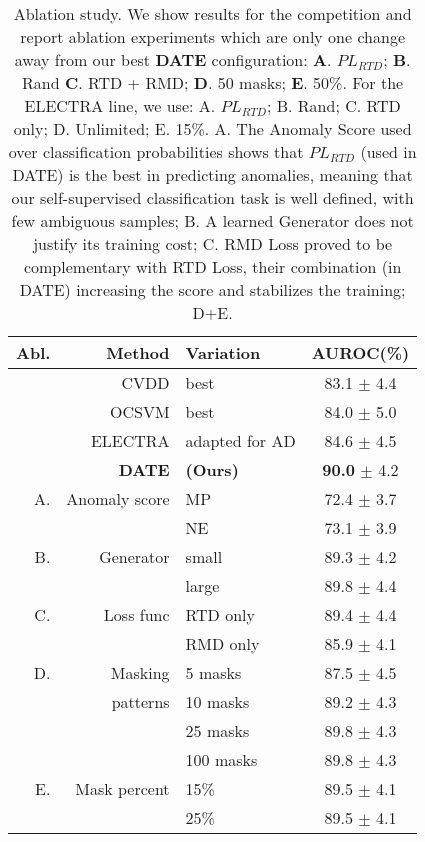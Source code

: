 \documentclass[11pt]{article}
\begin{document}
\setlength{\tabcolsep}{3pt}
\begin{table}[t!]
\begin{center}
	\begin{tabular}{r r l c}
		\toprule
		\multicolumn{1}{p{0.1cm}}{Abl.} &
        \multicolumn{1}{p{1.5cm}}{\raggedright \;\;\;\;\;\;\;\;\;\;\;Method} &
        \multicolumn{1}{p{0.5cm}}{\raggedleft Variation} &
        \multicolumn{1}{p{0.9cm}}{\centering AUROC(\%)} \\
        \midrule
        & CVDD  & best & 83.1 $\pm$ \small 4.4 \\
        
        & OCSVM & best & 84.0 $\pm$ \small 5.0 \\ 
        
        & ELECTRA & adapted for AD & 84.6  $\pm$ \small 4.5\\ 

        & \textbf{DATE} & \textbf{(Ours)} & \textbf{90.0} $\pm$ \small 4.2 \\ 
\midrule
        \midrule
        A. & Anomaly score  & MP &  72.4 $\pm$ \small  3.7\\
        &         		    & NE &  73.1 $\pm$ \small  3.9\\
		\midrule
		B. &  Generator   & small & 89.3  $\pm$ \small 4.2 \\ 
		&                 & large   & 89.8  $\pm$ \small 4.4 \\
		\midrule
		C. & Loss func    & RTD only & 89.4 $\pm$ \small 4.4 \\
		&                 & RMD only & 85.9 $\pm$ \small 4.1 \\
        \midrule
		D. & Masking       & 5 masks  &  87.5 $\pm$ \small 4.5 \\
        & patterns         & 10 masks &  89.2 $\pm$ \small 4.3 \\
        &                  & 25 masks &  89.8 $\pm$ \small 4.3 \\
	    &                   & 100 masks & 89.8 $\pm$ \small 4.3 \\ \midrule
        E. & Mask percent   & 15\% & 89.5 $\pm$ \small 4.1 \\ &                   & 25\% & 89.5 $\pm$ \small 4.1 \\ \bottomrule
    \end{tabular}
\end{center}
\caption{Ablation study. We show results for the competition and report ablation experiments which are only one change away from our best \textbf{DATE} configuration: \textbf{A}. $PL_{RTD}$; \textbf{B}. Rand \textbf{C}. RTD + RMD; \textbf{D}. 50 masks; \textbf{E}. 50\%. For the ELECTRA line, we use: A. $PL_{RTD}$; B. Rand; C. RTD only; D. Unlimited; E. 15\%.
A. The Anomaly Score used over classification probabilities shows that $PL_{RTD}$ (used in DATE) is the best in predicting anomalies, meaning that our self-supervised classification task is well defined, with few ambiguous samples; B. A learned Generator does not justify its training cost; C. RMD Loss proved to be complementary with RTD Loss, their combination (in DATE) increasing the score and stabilizes the training; D+E.}
\label{tab: ablation}
\end{table}
\end{document}
